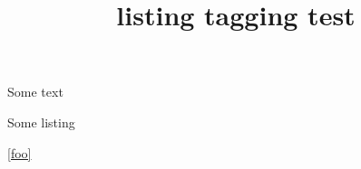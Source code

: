 \documentclass{article}
\title{listing tagging test}
\begin{document}
Some text
\begin{listing}\label{foo}
Some listing
\caption{Some caption}
\end{listing}
\ref{foo}

\listoflistings
\end{document}
